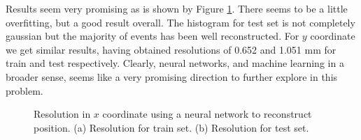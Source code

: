 Results seem very promising as is shown by Figure \ref{fig.nnPlot}. There seems to be a little overfitting, but a good result overall. The histogram for test set is not completely gaussian but the majority of events has been well reconstructed. For $y$ coordinate we get similar results, having obtained resolutions of 0.652 and 1.051 mm for train and test respectively. Clearly, neural networks, and machine learning in a broader sense, seems like a very promising direction to further explore in this problem.


\begin{figure}[!htb]
	\centering
	\caption{\label{fig.nnPlot} Resolution in $x$ coordinate using a neural network to reconstruct position. (a) Resolution for train set. (b) Resolution for test set.}
\end{figure}

